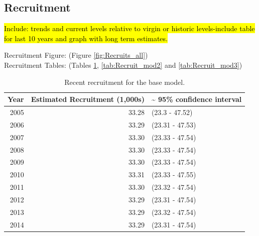 \documentclass[12pt,]{article}
\begin{document}
\FloatBarrier

\subsection*{Recruitment}\label{recruitment}

\hl{Include: trends and current levels relative to virgin or historic levels-include 
table for last 10 years and graph with long term estimates.}

Recruitment Figure: (Figure \ref{fig:Recruits_all})\\
Recruitment Tables: (Tables \ref{tab:Recruit_mod1},
\ref{tab:Recruit_mod2} and \ref{tab:Recruit_mod3})

\begin{table}[ht]
\centering
\caption{Recent recruitment for the base model.} 
\label{tab:Recruit_mod1}
\begin{tabular}{rrl}
  \hline
Year & Estimated Recruitment (1,000s) & \~{} 95\% confidence interval \\ 
  \hline
2005 & 33.28 & (23.3 - 47.52) \\ 
  2006 & 33.29 & (23.31 - 47.53) \\ 
  2007 & 33.30 & (23.33 - 47.54) \\ 
  2008 & 33.30 & (23.33 - 47.54) \\ 
  2009 & 33.30 & (23.33 - 47.54) \\ 
  2010 & 33.31 & (23.33 - 47.55) \\ 
  2011 & 33.30 & (23.32 - 47.54) \\ 
  2012 & 33.29 & (23.31 - 47.54) \\ 
  2013 & 33.29 & (23.32 - 47.54) \\ 
  2014 & 33.29 & (23.31 - 47.54) \\ 
   \hline
\end{tabular}
\end{table}

\FloatBarrier
\end{document}
